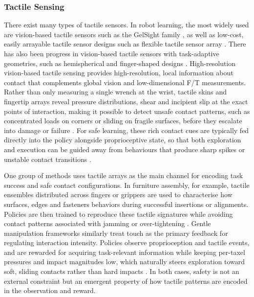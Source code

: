 \documentclass[Afour,sageh,times]{template/sagej}
\newcommand{\suggest}[1]{{\color{olive} (#1)}}
\begin{document}
\subsubsection{Tactile Sensing}
There exist many types of tactile sensors. In robot learning, the most widely used are vision-based tactile sensors such as the GelSight family \citep{yuan2017gelsight,wang2021gelsight}, as well as low-cost, easily arrayable tactile sensor designs such as flexible tactile sensor array \citep{huang20243d}. There has also been progress in vision-based tactile sensors with task-adaptive geometries, such as  hemispherical and finger-shaped designs \citep{11024242, sun2022soft, 9811966}. High-resolution vision-based tactile sensing provides high-resolution, local information about contact that complements global vision and low-dimensional F/T measurements. Rather than only measuring a single wrench at the wrist, tactile skins and fingertip arrays reveal pressure distributions, shear and incipient slip at the exact points of interaction, making it possible to detect unsafe contact patterns, such as concentrated loads on corners or sliding on fragile surfaces, before they escalate into damage or failure \citep{31,43,71}. For safe learning, these rich contact cues are typically fed directly into the policy alongside proprioceptive state, so that both exploration and execution can be guided away from behaviours that produce sharp spikes or unstable contact transitions \citep{71,106}.

One group of methods uses tactile arrays as the main channel for encoding task success and safe contact configurations. In furniture assembly, for example, tactile ensembles distributed across fingers or grippers are used to characterise how surfaces, edges and fasteners behaviors during successful insertions or alignments. Policies are then trained to reproduce these tactile signatures while avoiding contact patterns associated with jamming or over-tightening \cite{43}. Gentle manipulation frameworks similarly treat touch as the primary feedback for regulating interaction intensity. Policies observe proprioception and tactile events, and are rewarded for acquiring task-relevant information while keeping per-taxel pressures and impact magnitudes low, which naturally steers exploration toward soft, sliding contacts rather than hard impacts \cite{106}. In both cases, safety is not an external constraint but an emergent property of how tactile patterns are encoded in the observation and reward.
\end{document}
